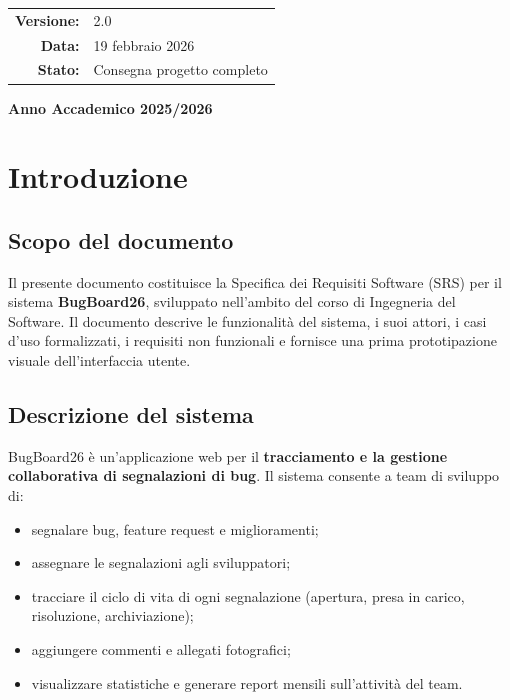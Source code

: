 ﻿\documentclass[a4paper,11pt]{article}
\begin{document}
\begin{titlepage}
\vspace{1cm}
\begin{tcolorbox}[
  colback=white,
  colframe=bbAccent,
  width=0.62\textwidth,
  arc=2mm,
  boxrule=0.8pt
]
\centering
\begin{tabular}{>{\bfseries}r l}
Versione: & 2.0 \\
Data: & 19 febbraio 2026 \\
Stato: & Consegna progetto completo \\
\end{tabular}
\end{tcolorbox}

\vfill
{\Large\color{bbPrimary}\bfseries Anno Accademico 2025/2026\par}
\end{titlepage}
\clearpage
{}
\hypersetup{pageanchor=true}

\tableofcontents
\newpage

\section{Introduzione}

\subsection{Scopo del documento}
Il presente documento costituisce la Specifica dei Requisiti Software (SRS) per il sistema \textbf{BugBoard26}, sviluppato nell'ambito del corso di Ingegneria del Software. Il documento descrive le funzionalit\`a del sistema, i suoi attori, i casi d'uso formalizzati, i requisiti non funzionali e fornisce una prima prototipazione visuale dell'interfaccia utente.

\subsection{Descrizione del sistema}
BugBoard26 \`e un'applicazione web per il \textbf{tracciamento e la gestione collaborativa di segnalazioni di bug}. Il sistema consente a team di sviluppo di:
\begin{itemize}
  \item segnalare bug, feature request e miglioramenti;
  \item assegnare le segnalazioni agli sviluppatori;
  \item tracciare il ciclo di vita di ogni segnalazione (apertura, presa in carico, risoluzione, archiviazione);
  \item aggiungere commenti e allegati fotografici;
  \item visualizzare statistiche e generare report mensili sull'attivit\`a del team.
\end{itemize}
\end{document}
